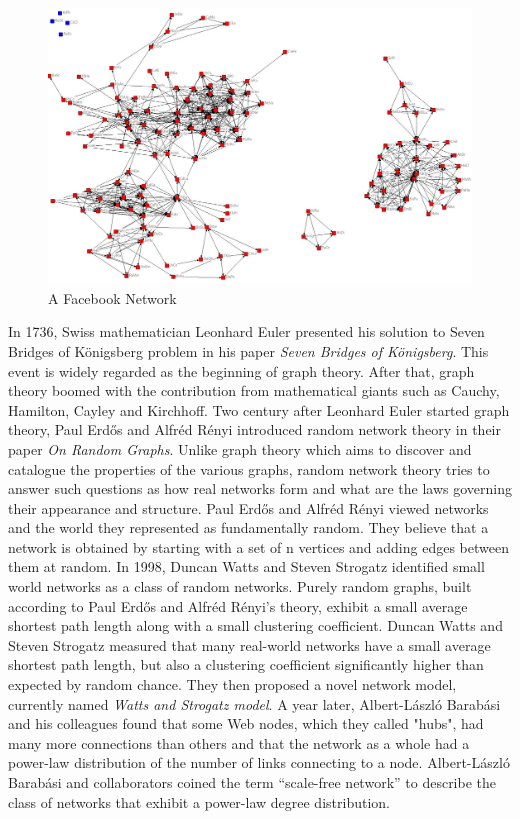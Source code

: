 \begin{figure}[ht!]
\includegraphics [totalheight=0.23\textheight]{images/facebook.jpg}
\caption {A Facebook Network}
\label {F:facebook}
\end{figure}

In 1736, Swiss mathematician Leonhard Euler 	presented his solution to Seven Bridges of K\"{o}nigsberg problem in his paper {\em Seven Bridges of K\"{o}nigsberg}\cite{www-graph}. This event is widely regarded as the beginning of graph theory. After that, graph theory boomed with the contribution from mathematical giants such as Cauchy, Hamilton, Cayley and Kirchhoff. Two century after Leonhard Euler started graph theory, Paul Erd\H{o}s and Alfr\'{e}d R\'{e}nyi introduced random network theory in their paper {\em On Random Graphs}\cite{www-random}. Unlike graph theory which aims to discover and catalogue the properties of the various graphs, random network theory tries to answer such questions as how real networks form and what are the laws governing their appearance and structure. Paul Erd\H{o}s and Alfr\'{e}d R\'{e}nyi viewed networks and the world they represented as fundamentally random.  They believe that a network is obtained by starting with a set of n vertices and adding edges between them at random. In 1998, Duncan Watts and Steven Strogatz identified small world networks as a class of random networks\cite{www-small}. Purely random graphs, built according to  Paul Erd\H{o}s and Alfr\'{e}d R\'{e}nyi's theory, exhibit a small average shortest path length along with a small clustering coefficient. Duncan Watts and Steven Strogatz measured that many real-world networks have a small average shortest path length, but also a clustering coefficient significantly higher than expected by random chance. They then proposed a novel network model, currently named {\em Watts and Strogatz model}. A year later, Albert-L\'{a}szl\'{o} Barab\'{a}si and his colleagues found that some Web nodes, which they called "hubs", had many more connections than others and that the network as a whole had a power-law distribution of the number of links connecting to a node\cite{www-scale}. Albert-L\'{a}szl\'{o} Barab\'{a}si and collaborators coined the term ``scale-free network'' to describe the class of networks that exhibit a power-law degree distribution. 


